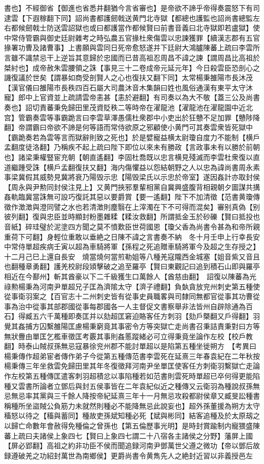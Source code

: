 書也】不經御省【御進也省悉井翻猶今言省審也】是帝欲不諦乎帝得奏震怒下有司逮雲【下遐稼翻下同】詔尚書都護劒戟送黄門北寺獄【都總也護監也詔尚書總監左右都候劒戟士防送雲詔獄也或曰都護當作都候賢曰前書音義曰北寺獄即若盧獄】使中常侍管霸與御史廷尉雜考之時弘農五官掾杜衆傷雲以忠諫獲罪【續漢志郡有五官掾署功曹及諸曹事】上書願與雲同日死帝愈怒遂并下廷尉大鴻臚陳蕃上疏曰李雲所言雖不識禁忌干上逆旨其意歸於忠國而已昔高祖忍周昌不諱之諫【謂周昌比高祖於桀紂也】成帝赦朱雲腰領之誅【事見三十二卷成帝元延元年】今日殺雲臣恐剖心之譏復議於世矣【謂暴如商受剖賢人之心也復扶又翻下同】太常楊秉雒陽市長沐茂【漢官儀曰雒陽市長秩四百石屬大司農沐音木集韻曰姓也風俗通漢有東平太守沐寵】郎中上官資並上疏請雲帝恚甚【恚於避翻】有司奏以為大不敬【蓋三公及尚書奏也】詔切責蕃秉免歸田里茂資貶秩二等時帝在濯龍池【濯龍池在濯龍園中近北宫】管霸奏雲等事霸跪言曰李雲草澤愚儒杜衆郡中小吏出於狂戇不足加罪【戇陟降翻】帝謂霸曰帝欲不諦是何等語而常侍欲原之邪顧使小黄門可其奏雲衆皆死獄中【霸跪奏若為雲等言而獄辭則致之死也】於是嬖寵益横太尉瓊自度力不能制【横戶孟翻度徒洛翻】乃稱疾不起上疏曰陛下即位以來未有勝政【言政事未有以勝於前朝也】諸梁秉權豎宦充朝【朝直遙翻】李固杜喬既以忠言横見殘滅而李雲杜衆復以直道繼踵受誅【横戶孟翻復扶又翻】海内傷懼益以怨結朝野之人以忠為諱尚書周永素事梁冀假其威勢見冀將衰乃陽毁示忠【陽毁梁氏以示忠於帝室】遂因姦計亦取封侯【周永與尹勲同封侯注見上】又黄門挾邪羣輩相黨自冀興盛腹背相親朝夕圖謀共搆姦軌臨冀當誅無可設巧復託其惡以要爵賞【要一遙翻】陛下不加清徵【范書黄瓊傳徵作澂澂與澄同譬之水也若清澂則塵翳在上滓濁在下不可得而混矣】審别真偽【别彼列翻】復與忠臣並時顯封粉墨雜糅【糅汝救翻】所謂抵金玉於砂礫【賢曰抵投也音紙】碎珪璧於泥塗四方聞之莫不憤歎臣世荷國恩【瓊父香為尚書令甚為和帝所親重荷下可翻】身輕位重敢以垂絶之日陳不諱之言書奏不納　冬十月壬申上行幸長安　中常侍單超疾病壬寅以超為車騎將軍【孫程之死追贈車騎將軍今及超之生存授之】十二月己巳上還自長安　燒當燒何當煎勒姐等八種羌寇隴西金城塞【姐音紫又音且也翻種章勇翻】護羌校尉段熲擊破之追至羅亭【賢曰東觀記曰追到積石山即與羅亭相近在今鄯州】斬其酋豪以下二千級獲生口萬餘人【酋慈由翻】　詔復以陳蕃為光祿勲楊秉為河南尹單超兄子匡為濟隂太守【濟子禮翻】負埶貪放兖州刺史第五種使從事衛羽案之【百官志十二州刺史皆有從事史員職畧與司隸同無都官從事其功曹從事為治中從事其部郡國從事每郡國各一人主督促文書察舉非法皆州自辟除通為百石】得臧五六千萬種即奏匡并以劾超匡窘迫賂客任方刺羽【劾戶槩翻又戶得翻】羽覺其姦捕方囚繫雒陽匡慮楊秉窮竟其事密令方等突獄亡走尚書召秉詰責秉對曰方等無狀釁由單匡乞檻車徵匡考覈其事則姦慝蹤緒必可立得秉竟坐論作左校【校戶教翻】時泰山賊叔孫無忌寇暴徐兖州郡不能討單超以是陷第五種坐徙朔方　【考異曰楊秉傳作超弟宦者傳作弟子今從第五種傳范書李雲死在延熹三年春袁紀在二年秋按楊秉傳三年坐救雲免歸田里其年冬復徵拜河南尹坐單匡使客任方刺衛羽繫獄亡走論作左校第五種傳匡遣客刺羽超積忿以事陷種若如范書則雲死時單超已卒何得更能陷種又雲書所論者立鄧后與封五侯事皆在二年袁紀似近之種傳又云衛羽為種說叔孫無忌無忌率其黨與三千餘人降按帝紀延熹三年十一月無忌攻殺都尉侯章又臧旻訟種書稱種所坐盜賊公負筋力未就然則種必不能降無忌此說妄也】超外孫董援為朔方太守稸怒以待之【稸與蓄同】種故吏孫斌知種必死【斌與彬同】結客追種及於太原刼之以歸亡命數年會赦得免種倫之曾孫也【第五倫歷事光明】是時封賞踰制内寵猥盛陳蕃上疏曰夫諸侯上象四七【賢曰上象四七謂二十八宿各主諸侯之分野】藩屏上國【屏必郢翻】高祖之約非功臣不侯而聞追録河南尹鄧萬世父遵之微功【帝以鄧后故録遵破羌之功紹封萬世為南鄉侯】更爵尚書令黄雋先人之絶封近習以非義授邑左
